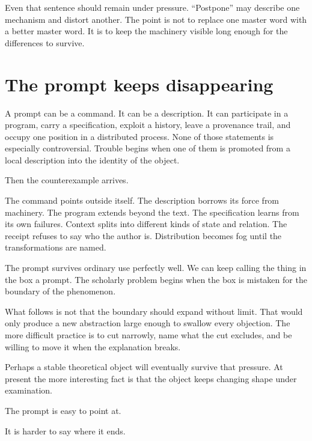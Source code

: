 \documentclass[11pt]{article}
\begin{document}
Even that sentence should remain under pressure. ``Postpone'' may describe one mechanism and distort another. The point is not to replace one master word with a better master word. It is to keep the machinery visible long enough for the differences to survive.

\section{The prompt keeps disappearing}

A prompt can be a command. It can be a description. It can participate in a program, carry a specification, exploit a history, leave a provenance trail, and occupy one position in a distributed process. None of those statements is especially controversial. Trouble begins when one of them is promoted from a local description into the identity of the object.

Then the counterexample arrives.

The command points outside itself. The description borrows its force from machinery. The program extends beyond the text. The specification learns from its own failures. Context splits into different kinds of state and relation. The receipt refuses to say who the author is. Distribution becomes fog until the transformations are named.

The prompt survives ordinary use perfectly well. We can keep calling the thing in the box a prompt. The scholarly problem begins when the box is mistaken for the boundary of the phenomenon.

What follows is not that the boundary should expand without limit. That would only produce a new abstraction large enough to swallow every objection. The more difficult practice is to cut narrowly, name what the cut excludes, and be willing to move it when the explanation breaks.

Perhaps a stable theoretical object will eventually survive that pressure. At present the more interesting fact is that the object keeps changing shape under examination.

The prompt is easy to point at.

It is harder to say where it ends.

\printbibliography
\end{document}
